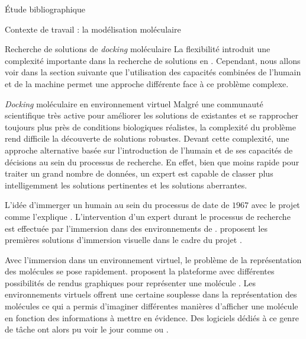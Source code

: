 \documentclass[myfrancais,ngerman,english,french]{mythesis}
\begin{document}
\begin{mychapter}{Étude bibliographique}
\begin{mysection}{Contexte de travail : la modélisation moléculaire}
\begin{mysubsection}{Recherche de solutions de \textit{docking} moléculaire}
				La flexibilité introduit une complexité importante dans la recherche de solutions en .
				Cependant, nous allons voir dans la section suivante que l'utilisation des capacités combinées de l'humain et de la machine permet une approche différente face à ce problème complexe.
			\end{mysubsection}
			\begin{mysubsection}{\textit{Docking} moléculaire en environnement virtuel}
				Malgré une communauté scientifique très active pour améliorer les solutions de  existantes et se rapprocher toujours plus près de conditions biologiques réalistes, la complexité du problème rend difficile la découverte de solutions robustes.
				Devant cette complexité, une approche alternative basée sur l'introduction de l'humain et de ses capacités de décisions au sein du processus de recherche.
				En effet, bien que moins rapide pour traiter un grand nombre de données, un expert est capable de classer plus intelligemment les solutions pertinentes et les solutions aberrantes.

				L'idée d'immerger un humain au sein du processus de  date de $1967$ avec le projet \myGROPE comme l'explique .
				L'intervention d'un expert durant le processus de recherche est effectuée par l'immersion dans des environnements de .
				 proposent les premières solutions d'immersion visuelle dans le cadre du projet \myGROPE.

				Avec l'immersion dans un environnement virtuel, le problème de la représentation des molécules se pose rapidement.
				 proposent la plateforme \myVIEW avec différentes possibilités de rendus graphiques pour représenter une molécule .
				Les environnements virtuels offrent une certaine souplesse dans la représentation des molécules ce qui a permis d'imaginer différentes manières d'afficher une molécule en fonction des informations à mettre en évidence.
				Des logiciels dédiés à ce genre de tâche ont alors pu voir le jour comme   ou \myPyMOL {}.

				\begin{myfigure}
				\end{myfigure}


\end{mysubsection}
\end{mysection}
\end{mychapter}
\end{document}

